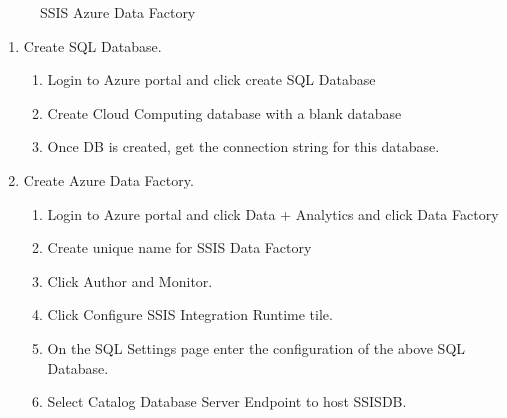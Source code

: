 \begin{figure}[!htb]
    \caption{\label{fig:SSIS_ADF} SSIS Azure Data Factory}
\end{figure}

\begin{enumerate}
 \item Create SQL Database. 
 \begin{enumerate}
 	\item Login to Azure portal and click create SQL Database
	\item Create Cloud Computing database with a blank database
	\item Once DB is created, get the connection string for this database.
 \end{enumerate}  
 \item Create Azure Data Factory. 
 \begin{enumerate}
 	\item Login to Azure portal and click Data + Analytics and click Data Factory
	\item Create unique name for SSIS Data Factory
	\item Click Author and Monitor.
	\item Click Configure SSIS Integration Runtime tile.
	\item On the SQL Settings page enter the configuration of the above SQL Database.
	\item Select Catalog Database Server Endpoint to host SSISDB.
 \end{enumerate}  
\end{enumerate}
 
